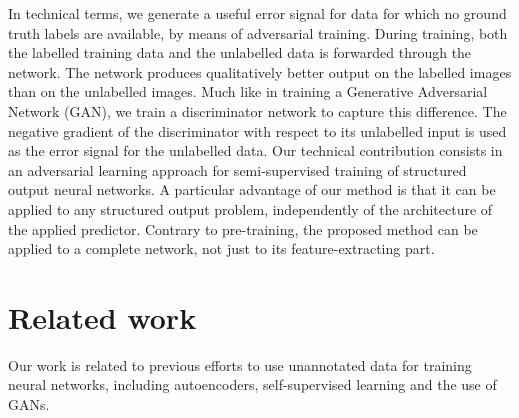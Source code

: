 \documentclass[a4paper]{article}
\begin{document}
In technical terms, we generate a useful error signal for data for which no ground truth labels are available, by means of adversarial training. During training, both the labelled training data and the unlabelled data is forwarded through the network. The network produces qualitatively better output on the labelled images than on the unlabelled images. Much like in training a Generative Adversarial Network (GAN), we train a discriminator network to capture this difference. The negative gradient of the discriminator with respect to its unlabelled input is used as the error signal for the unlabelled data. 
Our technical contribution consists in an adversarial learning approach for semi-supervised training of structured output neural networks.
A particular advantage of our method is that it can be applied to any structured output problem, independently of the architecture of the applied predictor.
Contrary to pre-training, the proposed method can be applied to a complete network, not just to its feature-extracting part.
\section{Related work}%
Our work is related to previous efforts to use unannotated data for training neural networks, including autoencoders, self-supervised learning and the use of GANs.
\end{document}
